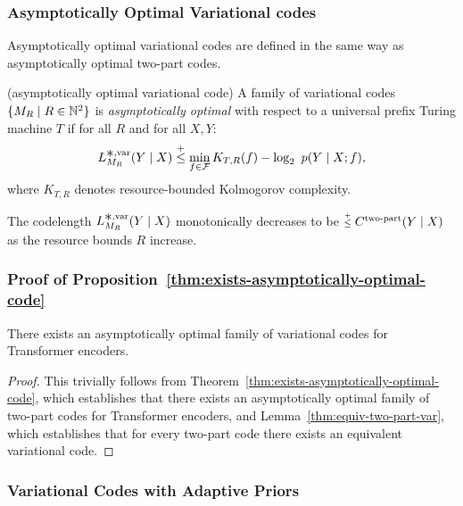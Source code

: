 \subsubsection{Asymptotically Optimal Variational codes}
\label{sec:asymptotically-optimal-var-codes}

Asymptotically optimal variational codes are defined in the same way as asymptotically optimal two-part codes.

\begin{defn}(asymptotically optimal variational code)
A family of variational codes ${\{ M_R \mid R \in {\mathbb{N}^2} \}}$ is \emph{asymptotically optimal} with respect to a universal prefix Turing machine $T$ if for all $R$ and for all $X,Y$:
\begin{equation}
    L^{\bigast,\text{var}}_{M_R}(Y \mid X) \leqc \min_{f \in \gF} K_{T,R}(f) -\log_2~p(Y \mid X;f),
\end{equation}
where $K_{T,R}$ denotes resource-bounded Kolmogorov complexity.
\end{defn}

The codelength $L^{\bigast,\text{var}}_{M_R}(Y \mid X)$ monotonically decreases to be $\leqc C^{\text{two-part}}(Y \mid X)$ as the resource bounds $R$ increase.

\subsubsection{Proof of Proposition~\ref{thm:exists-asymptotically-optimal-code}}\label{sec:proof-of-exists-asymptotically-optimal-code}

\begin{prop*}
There exists an asymptotically optimal family of variational codes for Transformer encoders.
\end{prop*}

\begin{proof}
This trivially follows from Theorem~\ref{thm:exists-asymptotically-optimal-code}, which establishes that there exists an asymptotically optimal family of two-part codes for Transformer encoders, and Lemma~\ref{thm:equiv-two-part-var}, which establishes that for every two-part code there exists an equivalent variational code.
\end{proof}

\subsubsection{Variational Codes with Adaptive Priors}
\label{sec:adaptive-prior}


